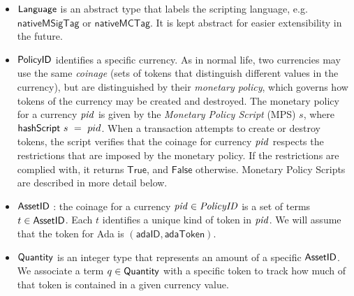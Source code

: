 \begin{itemize}

  \item $\mathsf{Language}$ is an abstract type that labels the scripting language, e.g.
    $\mathsf{nativeMSigTag}$ or $\mathsf{nativeMCTag}$. It is kept abstract for easier extensibility in the future.

  \item $\mathsf{PolicyID}$ identifies a specific currency.  As in normal life, two
    currencies may use the same \emph{coinage} (sets of tokens that distinguish different values in the currency),
    but are distinguished by their \emph{monetary policy}, which governs how tokens of the currency may be created
    and destroyed.
    The monetary policy for a currency $\mathit{pid}$ is given by the \emph{Monetary Policy Script}
    (MPS) $s$, where $\mathsf{hashScript}~s~=~pid$. When a transaction attempts to create or destroy tokens,
    the script verifies that the coinage for currency $\mathit{pid}$
    respects the restrictions that are imposed by the
    monetary policy. If the restrictions are complied with, it returns
    $\mathsf{True}$, and
    $\mathsf{False}$ otherwise.  Monetary Policy Scripts are described in more detail below.



  \item $\mathsf{AssetID}$ : the coinage for a currency $\mathit{pid} \in \mathit{PolicyID}$ is a set of terms
    $t\in\mathsf{AssetID}$.  Each $t$ identifies a unique kind of token in $\mathit{pid}$.
    We will assume that the token for Ada is $(\mathsf{adaID}, \mathsf{adaToken})$.

  \item $\mathsf{Quantity}$ is an integer type that represents an amount of a specific $\mathsf{AssetID}$. We associate
    a term $q\in\mathsf{Quantity}$ with a specific token to track how much of that token is contained in a given currency value.


\end{itemize}
